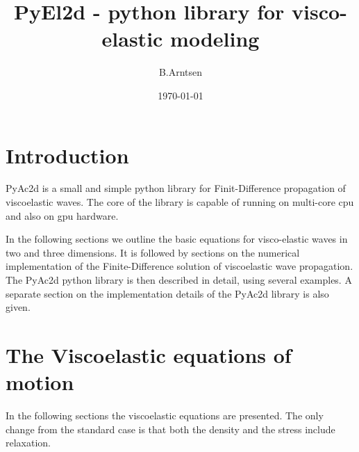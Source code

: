 \documentclass[11pt]{article}
\begin{document}
  
%
\newcommand{\dt}[1]{\partial_t{#1}}
\newcommand{\ddt}[1]{\partial^2_t{#1}}
\newcommand{\dddt}[1]{\partial^3_t{#1}}
\newcommand{\inv}[1]{\frac{1}{#1}}
\newcommand{\diff}[1]{D^+_{#1}}
\newcommand{\difb}[1]{D^-_{#1}}
\title{PyEl2d - python library for visco-elastic modeling} 
       
\author{B.Arntsen}
\date{\today}
\maketitle
\tableofcontents
\clearpage
\section{Introduction} 
PyAc2d is a small and simple python library for Finit-Difference 
propagation of viscoelastic waves. The core of the library is 
capable of running on
multi-core cpu and also on gpu hardware.

In the following sections we outline the basic equations 
for visco-elastic waves in two and three dimensions.
It is followed by sections on the numerical implementation of 
the Finite-Difference
solution of viscoelastic wave propagation.
The PyAc2d python library is then described in detail, using several
examples. 
A separate section on the implementation details of 
the PyAc2d library is also given.

\section{The Viscoelastic equations of motion} 
In the following sections the viscoelastic equations are presented.
The only change from the standard case is that both the density and
the stress include relaxation.
\end{document}
